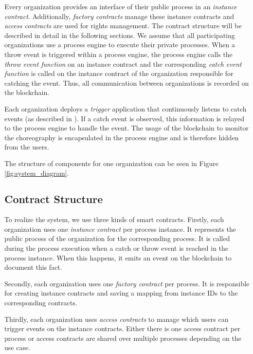 \documentclass[runningheads]{llncs}
\begin{document}
Every organization provides an interface of their public process in an \emph{instance contract}.
Additionally, \emph{factory contracts} manage these instance contracts and \emph{access contracts} are used for rights management.
The contract structure will be described in detail in the following sections.
We assume that all participating organizations use a process engine to execute their private processes.
When a throw event is triggered within a process engine, the process engine calls the \emph{throw event function} on an instance contract and the corresponding \emph{catch event function} is called on the instance contract of the organization responsible for catching the event.
Thus, all communication between organizations is recorded on the blockchain.

Each organization deploys a \emph{trigger} application that continuously listens to catch events (as described in \cite{weber2016untrusted}).
If a catch event is observed, this information is relayed to the process engine to handle the event.
The usage of the blockchain to monitor the choreography is encapsulated in the process engine and is therefore hidden from the users.

The structure of components for one organization can be seen in Figure \ref{fig:system_diagram}.

\subsection{Contract Structure}
To realize the system, we use three kinds of smart contracts.
Firstly, each organization uses one \emph{instance contract} per process instance.
It represents the public process of the organization for the corresponding process.
It is called during the process execution when a catch or throw event is reached in the process instance.
When this happens, it emits an event on the blockchain to document this fact.

Secondly, each organization uses one \emph{factory contract} per process.
It is responsible for creating instance contracts and saving a mapping from instance IDs to the corresponding contracts.

Thirdly, each organization uses \emph{access contracts} to manage which users can trigger events on the instance contracts.
Either there is one access contract per process or access contracts are shared over multiple processes depending on the use case.
\end{document}
